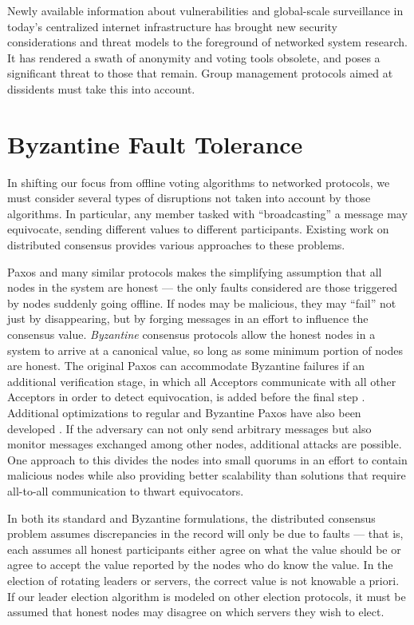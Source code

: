 Newly available information about vulnerabilities and global-scale
surveillance in today's centralized internet infrastructure has brought new
security considerations and threat models to the foreground of networked
system research. It has rendered a swath of anonymity and voting tools
obsolete, and poses a significant threat to those that remain. Group
management protocols aimed at dissidents must take this into account.

\section{Byzantine Fault Tolerance}
  In shifting our focus from offline voting algorithms to networked protocols,
  we must consider several types of disruptions not taken into account by
  those algorithms. In particular, any member tasked with ``broadcasting'' a
  message may equivocate, sending different values to different participants.
  Existing work on distributed consensus provides various approaches to these
  problems.

  Paxos and many similar protocols makes the simplifying assumption that all
  nodes in the system are honest --- the only faults considered are those
  triggered by nodes suddenly going offline. If nodes may be malicious, they
  may ``fail'' not just by disappearing, but by forging messages in an effort
  to influence the consensus value. \emph{Byzantine} consensus protocols allow
  the honest nodes in a system to arrive at a canonical value, so long as some
  minimum portion of nodes are honest. The original Paxos can
  accommodate Byzantine failures if an additional verification stage, in which
  all Acceptors communicate with all other Acceptors in order to detect
  equivocation, is added before the final step \cite{castro_practical_1999}.
  Additional optimizations to regular and Byzantine Paxos have also been
  developed \cite{lamport_fast_2006}. If the adversary can not only send
  arbitrary messages but also monitor messages exchanged among other nodes,
  additional attacks are possible. One approach to this divides the nodes into
  small quorums in an effort to contain malicious nodes \cite{king_load_2011}
  while also providing better scalability than solutions that require
  all-to-all communication to thwart equivocators.

  In both its standard and Byzantine formulations, the distributed consensus
  problem assumes discrepancies in the record will only be due to faults ---
  that is, each assumes all honest participants either agree on what the value
  should be or agree to accept the value reported by the nodes who do know the
  value.  In the election of rotating leaders or servers, the correct value is
  not knowable a priori. If our leader election algorithm is modeled on other
  election protocols, it must be assumed that honest nodes may disagree on
  which servers they wish to elect.


